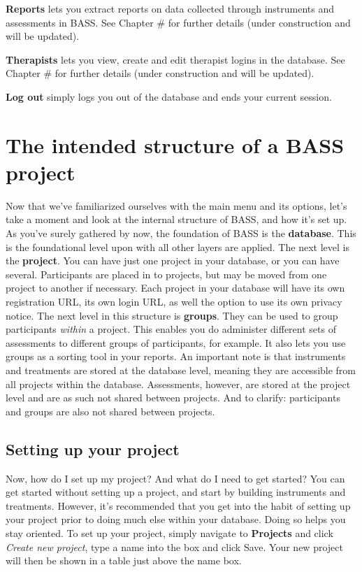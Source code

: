 \documentclass[]{book}
\begin{document}
\textbf{Reports} lets you extract reports on data collected through instruments and assessments in BASS. See Chapter \# for further details (under construction and will be updated).

\textbf{Therapists} lets you view, create and edit therapist logins in the database. See Chapter \# for further details (under construction and will be updated).

\textbf{Log out} simply logs you out of the database and ends your current session.

\hypertarget{the-intended-structure-of-a-bass-project}{%
\section{The intended structure of a BASS project}\label{the-intended-structure-of-a-bass-project}}

Now that we've familiarized ourselves with the main menu and its options, let's take a moment and look at the internal structure of BASS, and how it's set up.
As you've surely gathered by now, the foundation of BASS is the \textbf{database}. This is the foundational level upon with all other layers are applied. The next level is the \textbf{project}. You can have just one project in your database, or you can have several. Participants are placed in to projects, but may be moved from one project to another if necessary. Each project in your database will have its own registration URL, its own login URL, as well the option to use its own privacy notice.
The next level in this structure is \textbf{groups}. They can be used to group participants \emph{within} a project. This enables you do administer different sets of assessments to different groups of participants, for example. It also lets you use groups as a sorting tool in your reports.
An important note is that instruments and treatments are stored at the database level, meaning they are accessible from all projects within the database. Assessments, however, are stored at the project level and are as such not shared between projects.
And to clarify: participants and groups are also not shared between projects.

\hypertarget{setting-up-your-project}{%
\subsection{Setting up your project}\label{setting-up-your-project}}

Now, how do I set up my project? And what do I need to get started?
You can get started without setting up a project, and start by building instruments and treatments. However, it's recommended that you get into the habit of setting up your project prior to doing much else within your database. Doing so helps you stay oriented. To set up your project, simply navigate to \textbf{Projects} and click \emph{Create new project}, type a name into the box and click Save. Your new project will then be shown in a table just above the name box.
\end{document}
